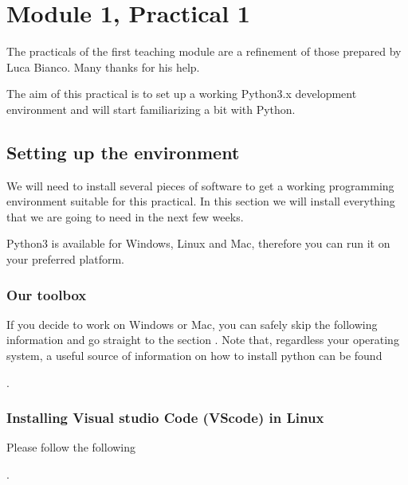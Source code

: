 \documentclass[letterpaper,10pt,english]{sphinxmanual}
\begin{document}
\sphinxstepscope


\chapter{Module 1, Practical 1}
\label{\detokenize{M1_practical1:Module-1,-Practical-1}}\label{\detokenize{M1_practical1::doc}}
\sphinxAtStartPar
The practicals of the first teaching module are a refinement of those prepared by Luca Bianco. Many thanks for his help.

\sphinxAtStartPar
The aim of this practical is to set up a working Python3.x development environment and will start familiarizing a bit with Python.


\section{Setting up the environment}
\label{\detokenize{M1_practical1:Setting-up-the-environment}}
\sphinxAtStartPar
We will need to install several pieces of software to get a working programming environment suitable for this practical. In this section we will install everything that we are going to need in the next few weeks.

\sphinxAtStartPar
Python3 is available for Windows, Linux and Mac, therefore you can run it on your preferred platform.


\subsection{Our toolbox}
\label{\detokenize{M1_practical1:Our-toolbox}}
\sphinxAtStartPar
If you decide to work on Windows or Mac, you can safely skip the following information and go straight to the section . Note that, regardless your operating system, a useful source of information on how to install python can be found %
\begin{footnote}[1]\sphinxAtStartFootnote
{}
%
\end{footnote}.


\subsection{Installing Visual studio Code (VScode) in Linux}
\label{\detokenize{M1_practical1:Installing-Visual-studio-Code-(VScode)-in-Linux}}
\sphinxAtStartPar
Please follow the following %
\begin{footnote}[2]\sphinxAtStartFootnote
{}
%
\end{footnote}.
\end{document}
